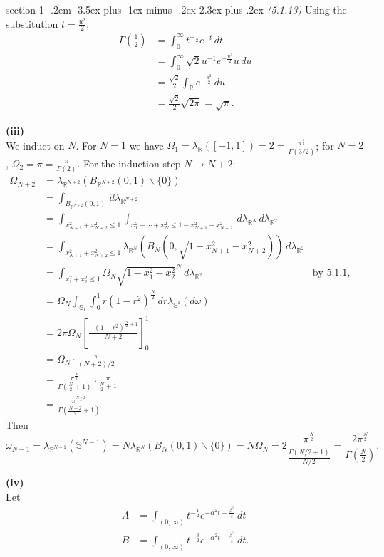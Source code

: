 \documentclass[12pt]{article}
\makeatletter
\theoremstyle{norm}
\newcommand{\bS}[0]{\mathbb{S}}
\newcommand{\R}[0]{\mathbb{R}}
\newcommand{\rc}[1]{\frac{1}{#1}}
\newcommand{\al}[0]{\alpha}
\newcommand{\be}[0]{\beta}
\newcommand{\Ga}[0]{\Gamma}
\newcommand{\la}[0]{\lambda}
\newcommand{\om}[0]{\omega}
\newcommand{\Om}[0]{\Omega}
\newcommand{\ba}[1]{\left[ {#1} \right]}
\newcommand{\pa}[1]{\left( {#1} \right)}
\newcommand{\subprob}[1]{\noindent\textbf{#1}\\}
\newcommand{\pf}[2]{\pa{\frac{#1}{#2}}}
\newcommand{\bs}[0]{\backslash}
\newcommand{\iy}[0]{\infty}
\newenvironment{problem}{\@startsection
       {section}
       {1}
       {-.2em}
       {-3.5ex plus -1ex minus -.2ex}
       {2.3ex plus .2ex}
       {\pagebreak[3]%
       \large\bf\noindent{Problem }
       }
       }
       {%
       }
\makeatother
\begin{document}
\begin{problem}{\it (5.1.13)}
Using the substitution $t=\frac{u^2}{2}$,
\begin{align*}
\Ga\pa{\rc 2}&=\int_0^{\iy} t^{-\rc 2}e^{-t}\,dt\\
&=\int_0^{\iy}\sqrt 2 u^{-1} e^{-\frac{u^2}{2}}u\,du\\
&=\frac{\sqrt{2}}{2}\int_{\R} e^{-\frac{u^2}{2}}\,du\\
&=\frac{\sqrt{2}}{2}\sqrt{2\pi}=\sqrt{\pi}.
\end{align*}

\subprob{(iii)}
We induct on $N$. For $N=1$ we have $\Om_1=\la_{\R}([-1,1])=2=\frac{\pi^{\rc2}}{\Ga(3/2)}$; for $N=2$, $\Om_2=\pi=\frac{\pi}{\Ga(2)}$. For the induction step $N\to N+2$:
\begin{align*}
\Om_{N+2}&=\la_{\R^{N+2}}(B_{\R^{N+2}}(0,1)\bs \{0\})\\
&=\int_{B_{\R^{N+2}}(0,1)}\,d\la_{\R^{N+2}}\\
&=\int_{x_{N+1}^2+x_{N+2}^2\le 1}\int_{x_1^2+\cdots +x_N^2\leq 1-x_{N+1}^2-x_{N+2}^2} \,d\la_{\R^{N}}\,d\la_{\R^2}\\
&=\int_{x_{N+1}^2+x_{N+2}^2\leq 1} \la_{\R^N}\pa{B_N\pa{0,\sqrt{1-x_{N+1}^2-x_{N+2}^2}}}\,d\la_{\R^2}\\
&=\int_{x_1^2+x_2^2\le 1}\Om_N \sqrt{1-x_1^2-x_2^2}^{N}\,d\la_{\R^2}&\text{by 5.1.1, 2.2.15}\\
&=\Om_N\int_{\bS_1}\int_0^1 r(1-r^2)^{\frac N2}\,dr\la_{\bS^1}(d\om)\\
&=2\pi \Om_N\ba{
\frac{-(1-r^2)^{\frac N2+1}}{N+2}
}^1_0\\
&=\Om_N\cdot \frac{\pi}{(N+2)/2}\\
&=\frac{\pi^{\frac N2}}{\Ga\pa{\frac N2+1}}\cdot \frac{\pi}{\frac N2+1}\\
&=\frac{\pi^{\frac {N+2}2}}{\Ga\pa{\frac {N+2}2+1}}
\end{align*}
Then
\[
\om_{N-1}=\la_{\bS^{N-1}}(\bS^{N-1})=N\la_{\R^N}(B_N(0,1)\bs\{0\})=N\Om_N=2\frac{\pi^{\frac{N}2}}{\frac{\Ga(N/2+1)}{N/2}}=\frac{2\pi^{\frac N2}}{\Ga\pf{N}{2}}.
\]

\subprob{(iv)}
Let 
\begin{align*}
A&=\int_{(0,\iy)} t^{-\frac 12} e^{-\al^2 t-\frac{\be^2}{t}}\,dt\\
B&=\int_{(0,\iy)} t^{-\frac 32} e^{-\al^2 t-\frac{\be^2}{t}}\,dt.
\end{align*}


\end{problem}
\end{document}
